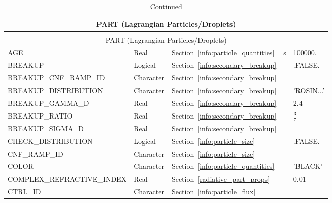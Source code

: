 \documentclass[11pt]{book}
\begin{document}
\begin{longtable}{@{\extracolsep{\fill}}|l|l|l|l|l|}
\caption[Lagrangian particles ({\ct PART} namelist group)]{For more information see Chapter~\ref{info:PART}.}
\label{tbl:PART} \\
\hline
\multicolumn{5}{|c|}{{\ct PART} (Lagrangian Particles/Droplets)} \\
\hline \hline
\endfirsthead
\caption[]{Continued} \\
\hline
\multicolumn{5}{|c|}{{\ct PART} (Lagrangian Particles/Droplets)} \\
\hline \hline
\endhead
{\ct AGE}                           & Real            & Section~\ref{info:particle_quantities}  & s         & 100000.       \\ \hline
{\ct BREAKUP}                       & Logical         & Section~\ref{info:secondary_breakup}    &           & {\ct .FALSE.} \\ \hline
{\ct BREAKUP\_CNF\_RAMP\_ID}        & Character       & Section~\ref{info:secondary_breakup}    &           &               \\ \hline
{\ct BREAKUP\_DISTRIBUTION}         & Character       & Section~\ref{info:secondary_breakup}    &           & {\ct 'ROSIN...'} \\ \hline
{\ct BREAKUP\_GAMMA\_D}             & Real            & Section~\ref{info:secondary_breakup}    &           & 2.4           \\ \hline
{\ct BREAKUP\_RATIO}                & Real            & Section~\ref{info:secondary_breakup}    &           & $\frac{3}{7}$ \\ \hline
{\ct BREAKUP\_SIGMA\_D}             & Real            & Section~\ref{info:secondary_breakup}    &           &               \\ \hline
{\ct CHECK\_DISTRIBUTION}           & Logical         & Section~\ref{info:particle_size}        &           & {\ct .FALSE.} \\ \hline
{\ct CNF\_RAMP\_ID}                 & Character       & Section~\ref{info:particle_size}        &           &               \\ \hline
{\ct COLOR}                         & Character       & Section~\ref{info:particle_quantities}  &           & {\ct 'BLACK'} \\ \hline
{\ct COMPLEX\_REFRACTIVE\_INDEX}    & Real            & Section~\ref{radiative_part_props}      &           & 0.01          \\ \hline
{\ct CTRL\_ID}                      & Character       & Section~\ref{info:particle_flux}        &           &               \\ \hline

\end{longtable}
\end{document}
